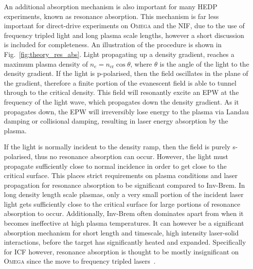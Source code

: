 An additional absorption mechanism is also important for many \ac{HEDP} experiments, known as resonance absorption.
This mechanism is far less important for direct-drive experiments on \textsc{Omega} and the \ac{NIF}, due to the use of frequency tripled light and long plasma scale lengths, however a short discussion is included for completeness.
An illustration of the procedure is shown in Fig.~\ref{fig:theory_res_abs}.
Light propagating up a density gradient, reaches a maximum plasma density of $n_e = n_{\text{cr}} \cos{\theta}$, where $\theta$ is the angle of the light to the density gradient.
If the light is p-polarised, then the field oscillates in the plane of the gradient, therefore a finite portion of the evanescent field is able to tunnel through to the critical density.
This field will resonantly excite an \ac{EPW} at the frequency of the light wave, which propagates down the density gradient.
As it propagates down, the \ac{EPW} will irreversibly lose energy to the plasma via Landau damping or collisional damping, resulting in laser energy absorption by the plasma.

If the light is normally incident to the density ramp, then the field is purely s-polarised, thus no resonance absorption can occur.
However, the light must propagate sufficiently close to normal incidence in order to get close to the critical surface.
This places strict requirements on plasma conditions and laser propagation for resonance absorption to be significant compared to \ac{Inv-Brem}.
In long density length scale plasmas, only a very small portion of the incident laser light gets sufficiently close to the critical surface for large portions of resonance absorption to occur.
Additionally, \ac{Inv-Brem} often dominates apart from when it becomes ineffective at high plasma temperatures.
It can however be a significant absorption mechanism for short length and timescale, high intensity laser-solid interactions, before the target has significantly heated and expanded.
Specifically for \ac{ICF} however, resonance absorption is thought to be mostly insignificant on \textsc{Omega} since the move to frequency tripled lasers~\cite{craxton_directdrive_2015}.

